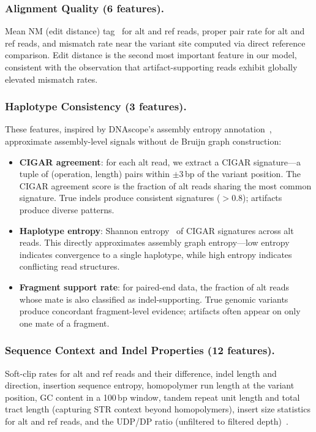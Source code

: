 \documentclass[sigconf]{acmart}
\begin{document}
\subsubsection{Alignment Quality (6 features).}
Mean NM (edit distance) tag~\cite{li2009sequence} for alt and ref reads, proper pair rate for alt and ref reads, and mismatch rate near the variant site computed via direct reference comparison. Edit distance is the second most important feature in our model, consistent with the observation that artifact-supporting reads exhibit globally elevated mismatch rates.

\subsubsection{Haplotype Consistency (3 features).}
These features, inspired by DNAscope's assembly entropy annotation~\cite{freed2022dnascope}, approximate assembly-level signals without de Bruijn graph construction:
\begin{itemize}
    \item \textbf{CIGAR agreement}: for each alt read, we extract a CIGAR signature---a tuple of (operation, length) pairs within $\pm 3$\,bp of the variant position. The CIGAR agreement score is the fraction of alt reads sharing the most common signature. True indels produce consistent signatures ($>0.8$); artifacts produce diverse patterns.
    \item \textbf{Haplotype entropy}: Shannon entropy~\cite{shannon1948mathematical} of CIGAR signatures across alt reads. This directly approximates assembly graph entropy---low entropy indicates convergence to a single haplotype, while high entropy indicates conflicting read structures.
    \item \textbf{Fragment support rate}: for paired-end data, the fraction of alt reads whose mate is also classified as indel-supporting. True genomic variants produce concordant fragment-level evidence; artifacts often appear on only one mate of a fragment.
\end{itemize}

\subsubsection{Sequence Context and Indel Properties (12 features).}
Soft-clip rates for alt and ref reads and their difference, indel length and direction, insertion sequence entropy, homopolymer run length at the variant position, GC content in a 100\,bp window, tandem repeat unit length and total tract length (capturing STR context beyond homopolymers), insert size statistics for alt and ref reads, and the UDP/DP ratio (unfiltered to filtered depth)~\cite{freed2022dnascope}.
\end{document}
